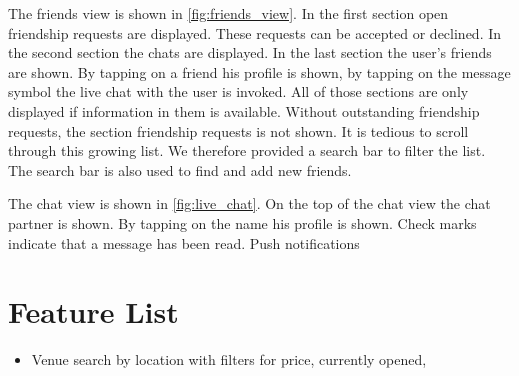\documentclass[11pt, accentcolor=tud1c]{tudreport}
\begin{document}
The friends view is shown in \autoref{fig:friends_view}. In the first section open friendship requests are displayed. These requests can be accepted or declined. In the second section the chats are displayed. In the last section the user's friends are shown. By tapping on a friend his profile is shown, by tapping on the message symbol the live chat with the user is invoked. 
All of those sections are only displayed if information in them is available. Without outstanding friendship requests, the section friendship requests is not shown. 
It is tedious to scroll through this growing list. We therefore provided a search bar to filter the list. The search bar is also used to find and add new friends. 

The chat view is shown in \autoref{fig:live_chat}. On the top of the chat view the chat partner is shown. By tapping on the name his profile is shown. Check marks indicate that a message has been read. Push notifications %



\chapter{Feature List}\label{ch:feature_list}
\begin{itemize}
\item Venue search by location with filters for price, currently opened, 

\end{itemize}
\end{document}
